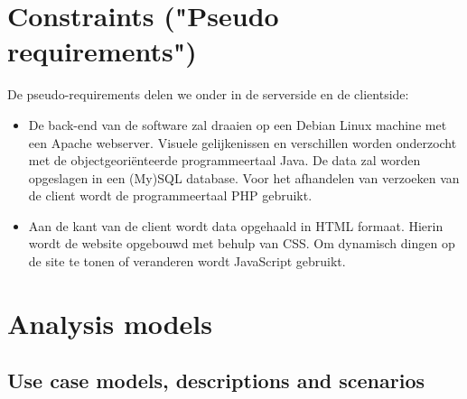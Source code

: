 \documentclass[a4paper,10pt]{article}
\begin{document}
		\clearpage
		\section{Constraints ("Pseudo requirements")}
			De pseudo-requirements delen we onder in de serverside en de clientside:
			\begin{itemize}
				\item De back-end van de software zal draaien op een Debian Linux machine met een Apache webserver. Visuele gelijkenissen en verschillen worden onderzocht met de objectgeori\"enteerde programmeertaal Java. De data zal worden opgeslagen in een (My)SQL database. Voor het afhandelen van verzoeken van de client wordt de programmeertaal PHP gebruikt.
				\item Aan de kant van de client wordt data opgehaald in HTML formaat. Hierin wordt de website opgebouwd met behulp van CSS. Om dynamisch dingen op de site te tonen of veranderen wordt JavaScript gebruikt.
			\end{itemize}
		
		\clearpage
		\section{Analysis models}
		\subsection{Use case models, descriptions and scenarios}
\end{document}
